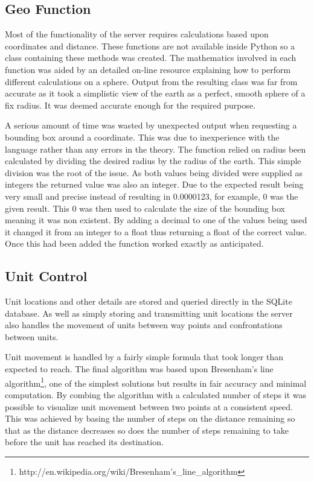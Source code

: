 \subsection{Geo Function}
Most of the functionality of the server requires calculations based upon coordinates and distance. These functions are not available inside Python so a class containing these methods was created. The mathematics involved in each function was aided by an detailed on-line resource\cite{geo} explaining how to perform different calculations on a sphere. Output from the resulting class was far from accurate as it took a simplistic view of the earth as a perfect, smooth sphere of a fix radius. It was deemed accurate enough for the required purpose.

A serious amount of time was wasted by unexpected output when requesting a bounding box around a coordinate. This was due to inexperience with the language rather than any errors in the theory. The function relied on radius been calculated by dividing the desired radius by the radius of the earth. This simple division was the root of the issue. As both values being divided were supplied as integers the returned value was also an integer. Due to the expected result being very small and precise instead of resulting in 0.0000123, for example, 0 was the given result. This 0 was then used to calculate the size of the bounding box meaning it was non existent. By adding a decimal to one of the values being used it changed it from an integer to a float thus returning a float of the correct value. Once this had been added the function worked exactly as anticipated.


\subsection{Unit Control}
Unit locations and other details are stored and queried directly in the SQLite database. As well as simply storing and transmitting unit locations the server also handles the movement of units between way points and confrontations between units.

Unit movement is handled by a fairly simple formula that took longer than expected to reach. The final algorithm was based upon Bresenham's line algorithm\footnote{http://en.wikipedia.org/wiki/Bresenham's\_line\_algorithm}, one of the simplest solutions but results in fair accuracy and minimal computation. By combing the algorithm with a calculated number of steps it was possible to visualize unit movement between two points at a consistent speed. This was achieved by basing the number of steps on the distance remaining so that as the distance decreases so does the number of steps remaining to take before the unit has reached its destination.

